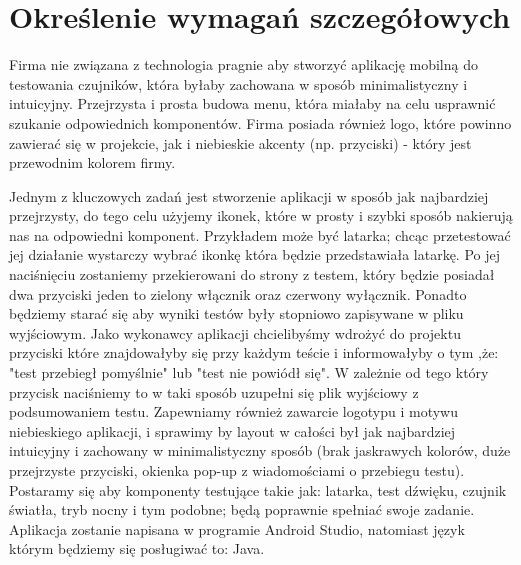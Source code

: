 \newpage
\section{Określenie wymagań szczegółowych}		%

\hspace{0.60cm}Firma nie związana z technologia pragnie aby stworzyć aplikację mobilną do testowania czujników, która byłaby  zachowana w sposób minimalistyczny i intuicyjny. Przejrzysta i prosta budowa menu, która miałaby na celu usprawnić szukanie odpowiednich komponentów. Firma posiada również logo, które powinno zawierać się w projekcie, jak i niebieskie akcenty (np. przyciski) - który jest przewodnim kolorem firmy. \newline

Jednym z kluczowych zadań jest stworzenie aplikacji w sposób jak najbardziej przejrzysty, do tego celu użyjemy ikonek, które w prosty i szybki sposób nakierują nas na odpowiedni komponent. Przykładem może być latarka; chcąc przetestować jej działanie wystarczy wybrać ikonkę która będzie przedstawiała latarkę. Po jej naciśnięciu zostaniemy przekierowani do strony z testem, który będzie posiadał dwa przyciski jeden to zielony włącznik oraz czerwony wyłącznik. Ponadto będziemy starać się aby wyniki testów były stopniowo zapisywane w pliku wyjściowym. Jako wykonawcy aplikacji chcielibyśmy wdrożyć do projektu przyciski które znajdowałyby się przy każdym teście i informowałyby o tym ,że: "test przebiegł pomyślnie" lub "test nie powiódł się". W zależnie od tego który przycisk naciśniemy to w taki sposób uzupełni się plik wyjściowy z podsumowaniem testu. Zapewniamy również zawarcie logotypu i motywu niebieskiego aplikacji, i sprawimy by layout w całości był jak najbardziej intuicyjny i zachowany w minimalistyczny sposób (brak jaskrawych kolorów, duże przejrzyste przyciski, okienka pop-up z wiadomościami o przebiegu testu). Postaramy się aby komponenty testujące takie jak: latarka, test dźwięku, czujnik światła, tryb nocny i tym podobne; będą poprawnie spełniać swoje zadanie. Aplikacja zostanie napisana w programie Android Studio, natomiast język którym będziemy się posługiwać to: Java. \newline

